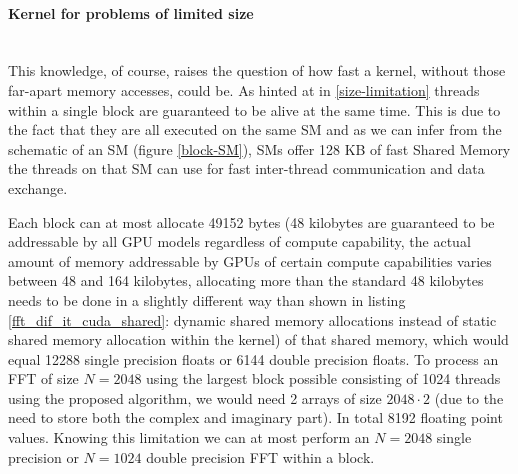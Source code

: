 \documentclass[english,11pt,a4paper,table]{article} %
\begin{document}

\paragraph{Kernel for problems of limited size}\mbox{}\\
\label{size-limitation}
This knowledge, of course, raises the question of how fast a kernel, without those far-apart memory accesses, could be.
As hinted at in \ref{size-limitation} threads within a single block are guaranteed to be alive at the same time.
This is due to the fact that they are all executed on the same SM and as we can infer from the schematic of an SM (figure \ref{block-SM}), SMs offer 128 KB of fast Shared Memory the threads on that SM can use for fast inter-thread communication and data exchange.

Each block can at most allocate 49152 bytes (48 kilobytes are guaranteed to be addressable by all GPU models regardless of compute capability, the actual amount of memory addressable by GPUs of certain compute capabilities varies between 48 and 164 kilobytes, allocating more than the standard 48 kilobytes needs to be done in a slightly different way than shown in listing \ref{fft_dif_it_cuda_shared}: dynamic shared memory allocations instead of static shared memory allocation within the kernel) of that shared memory, which would equal 12288 single precision floats or 6144 double precision floats. To process an FFT of size $N = 2048$ using the largest block possible consisting of 1024 threads using the proposed algorithm, we would need 2 arrays of size $2048 \cdot 2$ (due to the need to store both the complex and imaginary part). In total 8192 floating point values.
Knowing this limitation we can at most perform an $N=2048$ single precision or $N=1024$ double precision FFT within a block.
\end{document}
